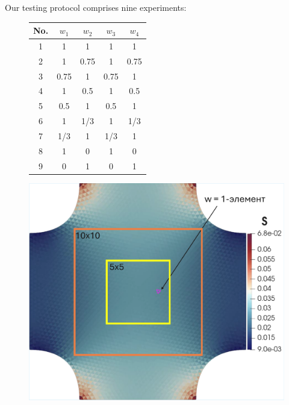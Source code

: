  
 
Our testing protocol comprises nine experiments:

\begin{figure}[H]
  \centering
  \begin{minipage}[t]{0.48\textwidth}
    \centering
    \vspace{0pt}
    \begin{tabular}{|c|c|c|c|c|}
    \hline
    \textbf{No.} & $w_1$ & $w_2$ & $w_3$ & $w_4$ \\
    \hline
    1 & 1 & 1 & 1 & 1 \\
    2 & 1 & 0.75 & 1 & 0.75 \\
    3 & 0.75 & 1 & 0.75 & 1 \\
    4 & 1 & 0.5 & 1 & 0.5 \\
    5 & 0.5 & 1 & 0.5 & 1 \\
    6 & 1 & 1/3 & 1 & 1/3 \\
    7 & 1/3 & 1 & 1/3 & 1 \\
    8 & 1 & 0 & 1& 0 \\
    9 & 0 & 1 & 0 & 1 \\
    \hline
    \end{tabular}
    \label{tab:test_protocols}
  \end{minipage}\hfill
  \begin{minipage}[t]{0.48\textwidth}
    \centering
    \vspace{0pt}
    \includegraphics[width=\linewidth]{../img/Numerical/malt_window.pdf}
    \label{fig:malt_window}
  \end{minipage}
\end{figure}


